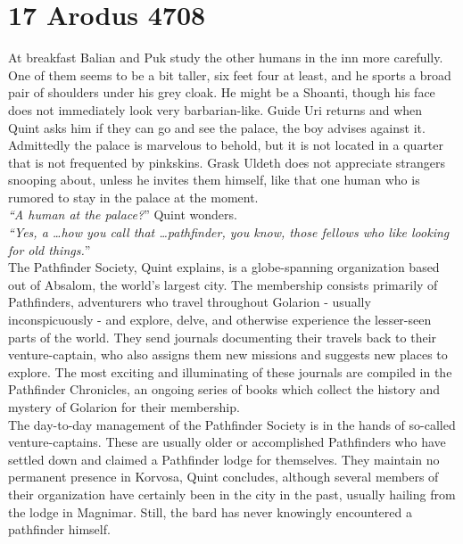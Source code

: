 \section{17 Arodus 4708}

At breakfast Balian and Puk study the other humans in the inn more carefully. One of them seems to be a bit taller, six feet four at least, and he sports a broad pair of shoulders under his grey cloak. He might be a Shoanti, though his face does not immediately look very barbarian-like. Guide Uri returns and when Quint asks him if they can go and see the palace, the boy advises against it. Admittedly the palace is marvelous to behold, but it is not located in a quarter that is not frequented by pinkskins. Grask Uldeth does not appreciate strangers snooping about, unless he invites them himself, like that one human who is rumored to stay in the palace at the moment.\\

{\itshape``A human at the palace?}'' Quint wonders.\\

{\itshape``Yes, a \ldots how you call that \ldots pathfinder, you know, those fellows who like looking for old things.}''\\

The Pathfinder Society, Quint explains, is a globe-spanning organization based out of Absalom, the world's largest city. The membership consists primarily of Pathfinders, adventurers who travel throughout Golarion - usually inconspicuously - and explore, delve, and otherwise experience the lesser-seen parts of the world. They send journals documenting their travels back to their venture-captain, who also assigns them new missions and suggests new places to explore. The most exciting and illuminating of these journals are compiled in the Pathfinder Chronicles, an ongoing series of books which collect the history and mystery of Golarion for their membership.\\

The day-to-day management of the Pathfinder Society is in the hands of so-called venture-captains. These are usually older or accomplished Pathfinders who have settled down and claimed a Pathfinder lodge for themselves. They maintain no permanent presence in Korvosa, Quint concludes, although several members of their organization have certainly been in the city in the past, usually hailing from the lodge in Magnimar. Still, the bard has never knowingly encountered a pathfinder himself.\\

